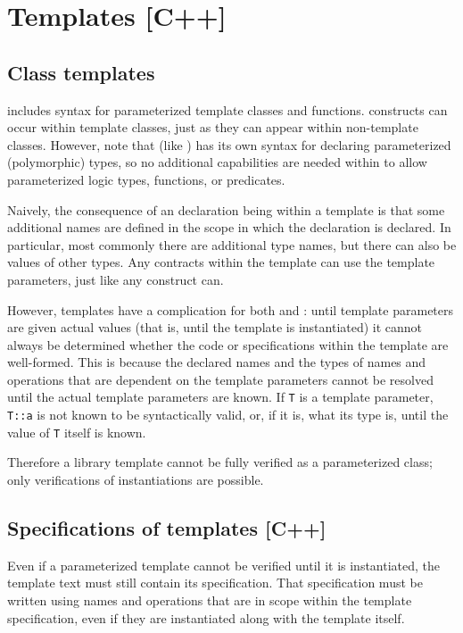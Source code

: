 \section{Templates [C++]}
\label{sec:templates}
\subsection{Class templates}

\lang includes syntax for parameterized template classes and functions.  \NAME constructs can occur within template classes, just as they can appear within non-template classes. However, note that \NAME (like \acsl) has its own syntax for declaring parameterized (polymorphic) types, so no additional 
capabilities are needed within \NAME to allow
parameterized logic types, functions, or predicates.

Naively, the consequence of an \NAME declaration being within a template is that some additional names are defined in the scope in which the \NAME declaration is declared. In particular, most commonly there are additional type names, but there can also be values of other types. Any \NAME contracts within the template can use the template parameters, just like any \lang construct can. 

However, templates have a complication for both \lang and \NAME: until template parameters are given actual values (that is, until the template is instantiated) it cannot always be determined whether the code or specifications within the template are well-formed. This is because the declared names and the types of names and operations that are dependent on the template parameters cannot be resolved until the actual template parameters are known.  If \lstinline|T| is a template parameter, \lstinline|T::a| is not known to be syntactically valid, or, if it is, what its type is, until the value of \lstinline|T| itself is known.

Therefore a library template cannot be fully verified as a parameterized class; only verifications of instantiations are possible.

\subsection{Specifications of templates [C++]}

Even if a parameterized template cannot be verified until it is instantiated, the template text must still contain its specification. That specification must be written using names and operations that are in scope within the template specification, even if they are instantiated along with the template itself.

